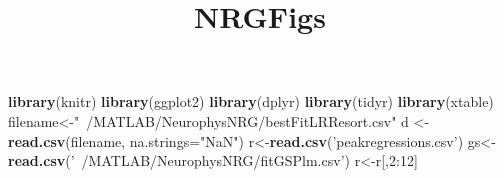 \documentclass[]{article}
\title{NRGFigs}
\author{}
\date{}
\newenvironment{Shaded}{\begin{snugshade}}{\end{snugshade}}
\newcommand{\KeywordTok}[1]{\textcolor[rgb]{0.13,0.29,0.53}{\textbf{{#1}}}}
\newcommand{\DataTypeTok}[1]{\textcolor[rgb]{0.13,0.29,0.53}{{#1}}}
\newcommand{\DecValTok}[1]{\textcolor[rgb]{0.00,0.00,0.81}{{#1}}}
\newcommand{\StringTok}[1]{\textcolor[rgb]{0.31,0.60,0.02}{{#1}}}
\newcommand{\OtherTok}[1]{\textcolor[rgb]{0.56,0.35,0.01}{{#1}}}
\newcommand{\NormalTok}[1]{{#1}}
\begin{document}
\maketitle


\begin{Shaded}
\begin{Highlighting}[]
\KeywordTok{library}\NormalTok{(knitr)}
\KeywordTok{library}\NormalTok{(ggplot2)}
\KeywordTok{library}\NormalTok{(dplyr)}
\KeywordTok{library}\NormalTok{(tidyr)}
\KeywordTok{library}\NormalTok{(xtable)}
\NormalTok{filename<-}\StringTok{"~/MATLAB/NeurophysNRG/bestFitLRResort.csv"}
\NormalTok{d <-}\StringTok{ }\KeywordTok{read.csv}\NormalTok{(filename, }\DataTypeTok{na.strings=}\StringTok{"NaN"}\NormalTok{)}
\NormalTok{r<-}\KeywordTok{read.csv}\NormalTok{(}\StringTok{'peakregressions.csv'}\NormalTok{)}
\NormalTok{gs<-}\KeywordTok{read.csv}\NormalTok{(}\StringTok{'~/MATLAB/NeurophysNRG/fitGSPlm.csv'}\NormalTok{)}
\NormalTok{r<-r[,}\DecValTok{2}\NormalTok{:}\DecValTok{12}\NormalTok{]}
\end{Highlighting}
\end{Shaded}

\begin{Shaded}
\end{Shaded}
\end{document}
